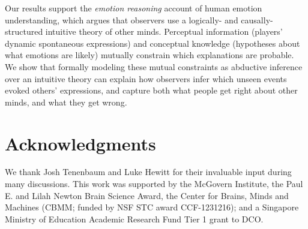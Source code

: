 \documentclass[10pt,letterpaper]{article}
\begin{document}
Our results support the {\em emotion reasoning} account of human emotion understanding, which argues that observers use a logically- and causally-structured intuitive theory of other minds. Perceptual information (players' dynamic spontaneous expressions) and conceptual knowledge (hypotheses about what emotions are likely) mutually constrain which explanations are probable. We show that formally modeling these mutual constraints as abductive inference over an intuitive theory can explain how observers infer which unseen events evoked others' expressions, and capture both what people get right about other minds, and what they get wrong.


\section{Acknowledgments}
We thank Josh Tenenbaum and Luke Hewitt for their invaluable input during many discussions. This work was supported by the McGovern Institute, the Paul E. and Lilah Newton Brain Science Award, the Center for Brains, Minds and Machines (CBMM; funded by NSF STC award CCF-1231216); and a Singapore Ministry of Education Academic Research Fund Tier 1 grant to DCO.

\vspace{2mm}


\printbibliography 
\end{document}
